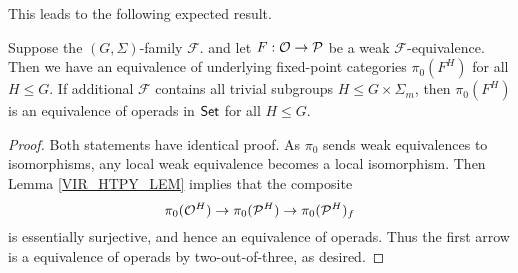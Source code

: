 \documentclass[a4paper,10pt
,draft
]{article}%
\renewcommand{\F}{\mathcal F}
\renewcommand{\1}{\eta}%
\begin{document}
This leads to the following expected result.
\begin{corollary}
      Suppose the $(G, \Sigma)$-family $\F$. %
      and let $F: \mathcal{O} \to \mathcal{P}$ be a weak $\F$-equivalence.
      Then we have an equivalence of underlying fixed-point categories
      $\pi_0(F^H)$ for all $H \leq G$.
      If additional $\F$ contains all trivial subgroups $H \leq G \times \Sigma_m$, then
      $\pi_0(F^H)$ is an equivalence of operads in $\mathsf{Set}$ for all $H \leq G$.
\end{corollary}
\begin{proof}
      Both statements have identical proof.
      As $\pi_0$ sends weak equivalences to isomorphisms, any local weak equivalence becomes a local isomorphism.
      Then Lemma \ref{VIR_HTPY_LEM} implies that the composite
      \[
            \pi_0(\mathcal{O}^H) \to \pi_0(\mathcal{P}^H) \to \pi_0(\mathcal{P}^H)_f
      \]
      is essentially surjective, and hence an equivalence of operads.
      Thus the first arrow is a equivalence of operads by two-out-of-three, as desired.
\end{proof}


  
\end{document}
